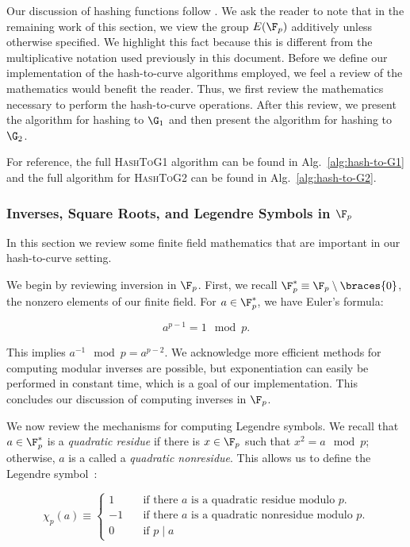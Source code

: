 Our discussion of hashing functions follow
\cite{ft2012bnhashtocurve,boneh2019h2cBLS12}.
We ask the reader to note that in the remaining work of this section,
we view the group $E(\F_{p})$ additively unless otherwise specified.
We highlight this fact because this is different from the multiplicative
notation used previously in this document.
Before we define our implementation of the hash-to-curve algorithms employed,
we feel a review of the mathematics would benefit the reader.
Thus, we first
review the mathematics necessary to perform the hash-to-curve operations.
After this review, we present the algorithm for hashing to $\G_{1}$
and then present the algorithm for hashing to $\G_{2}$.

For reference, the full \textsc{HashToG1} algorithm can be
found in Alg.~\ref{alg:hash-to-G1} and the full algorithm for \textsc{HashToG2}
can be found in Alg.~\ref{alg:hash-to-G2}.



\subsubsection{Inverses, Square Roots, and Legendre Symbols
    in $\F_{p}$}
\label{sssec:finite_math_Fp}

In this section we review some finite field mathematics that are
important in our hash-to-curve setting.

We begin by reviewing inversion in $\F_{p}$.
First, we recall $\F_{p}^{*} \equiv \F_{p}\setminus\braces{0}$,
the nonzero elements of our finite field.
For $a\in\F_{p}^{*}$, we have Euler's formula:

\begin{equation}
    a^{p-1} = 1 \mod p.
\end{equation}

\noindent
This implies $a^{-1} \mod p = a^{p-2}$.
We acknowledge more efficient methods for computing modular inverses are
possible, but exponentiation can easily be performed in constant time, which
is a goal of our implementation. This concludes our discussion of computing
inverses in $\F_{p}$.

We now review the mechanisms for
computing Legendre symbols.
We recall that $a\in\F_{p}^{*}$ is a \emph{quadratic residue}
if there is $x\in\F_{p}$ such that $x^{2} = a \mod p$;
otherwise, $a$ is a called a \emph{quadratic nonresidue}.
This allows us to define the Legendre symbol~\cite{imc2008}:

\begin{equation}
    \chi_{p}(a) \equiv \begin{cases}
        1 \quad& \text{if there $a$ is a quadratic residue modulo $p$.} \\
        -1 \quad& \text{if there $a$ is a quadratic nonresidue modulo $p$.} \\
        0 \quad& \text{if $p \mid a$}
    \end{cases}
\end{equation}

